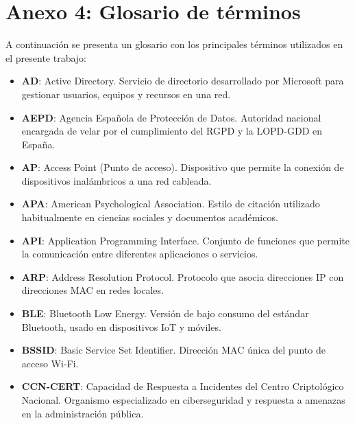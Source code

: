 \documentclass[a4paper, 11pt]{article}
\begin{document}
\clearpage
\thispagestyle{nohead}

\section*{Anexo 4: Glosario de términos}
\label{anexo:4}

A continuación se presenta un glosario con los principales términos utilizados en el presente trabajo:

\begin{itemize}

    \item \textbf{AD}: Active Directory. Servicio de directorio desarrollado por Microsoft para gestionar usuarios, equipos y recursos en una red.

    \item \textbf{AEPD}: Agencia Española de Protección de Datos. Autoridad nacional encargada de velar por el cumplimiento del RGPD y la LOPD-GDD en España.

    \item \textbf{AP}: Access Point (Punto de acceso). Dispositivo que permite la conexión de dispositivos inalámbricos a una red cableada.

    \item \textbf{APA}: American Psychological Association. Estilo de citación utilizado habitualmente en ciencias sociales y documentos académicos.

    \item \textbf{API}: Application Programming Interface. Conjunto de funciones que permite la comunicación entre diferentes aplicaciones o servicios.

    \item \textbf{ARP}: Address Resolution Protocol. Protocolo que asocia direcciones IP con direcciones MAC en redes locales.

    \item \textbf{BLE}: Bluetooth Low Energy. Versión de bajo consumo del estándar Bluetooth, usado en dispositivos IoT y móviles.

    \item \textbf{BSSID}: Basic Service Set Identifier. Dirección MAC única del punto de acceso Wi-Fi.

    \item \textbf{CCN-CERT}: Capacidad de Respuesta a Incidentes del Centro Criptológico Nacional. Organismo especializado en ciberseguridad y respuesta a amenazas en la administración pública.


\end{itemize}
\end{document}
